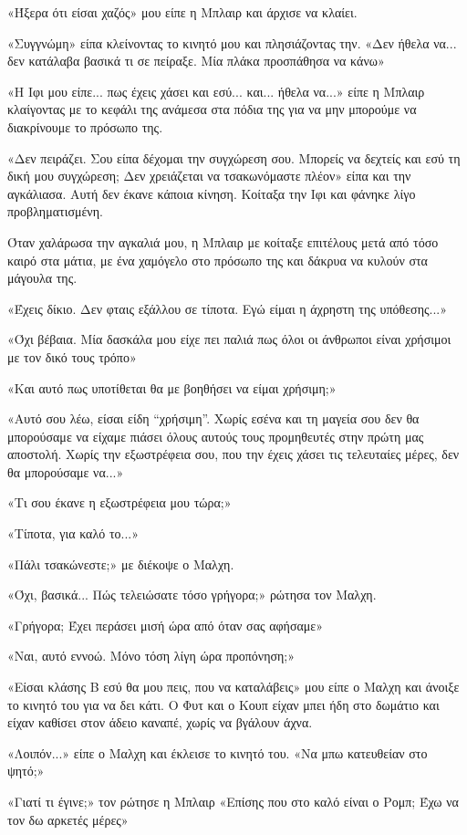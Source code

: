\documentclass[12pt,twoside, openany]{book}
\begin{document}
«Ήξερα ότι είσαι χαζός» μου είπε η Μπλαιρ και άρχισε να κλαίει.

«Συγγνώμη» είπα κλείνοντας το κινητό μου και πλησιάζοντας την. «Δεν ήθελα να... δεν κατάλαβα βασικά τι σε πείραξε. Μία πλάκα προσπάθησα να κάνω»

«Η Ιφι μου είπε... πως έχεις χάσει και εσύ... και... ήθελα να...» είπε η Μπλαιρ κλαίγοντας με το κεφάλι της ανάμεσα στα πόδια της για να μην μπορούμε να διακρίνουμε το πρόσωπο της.

«Δεν πειράζει. Σου είπα δέχομαι την συγχώρεση σου. Μπορείς να δεχτείς και εσύ τη δική μου συγχώρεση; Δεν χρειάζεται να τσακωνόμαστε πλέον» είπα και την αγκάλιασα. Αυτή δεν έκανε κάποια κίνηση. Κοίταξα την Ιφι και φάνηκε λίγο προβληματισμένη.

Όταν χαλάρωσα την αγκαλιά μου, η Μπλαιρ με κοίταξε επιτέλους μετά από τόσο καιρό στα μάτια, με ένα χαμόγελο στο πρόσωπο της και δάκρυα να κυλούν στα μάγουλα της.

«Έχεις δίκιο. Δεν φταις εξάλλου σε τίποτα. Εγώ είμαι η άχρηστη της υπόθεσης...»

«Όχι βέβαια. Μία δασκάλα μου είχε πει παλιά πως όλοι οι άνθρωποι είναι χρήσιμοι με τον δικό τους τρόπο»

«Και αυτό πως υποτίθεται θα με βοηθήσει να είμαι χρήσιμη;»

«Αυτό σου λέω, είσαι είδη “χρήσιμη”. Χωρίς εσένα και τη μαγεία σου δεν θα μπορούσαμε να είχαμε πιάσει όλους αυτούς τους προμηθευτές στην πρώτη μας αποστολή. Χωρίς την εξωστρέφεια σου, που την έχεις χάσει τις τελευταίες μέρες, δεν θα μπορούσαμε να...»

«Τι σου έκανε η εξωστρέφεια μου τώρα;»

«Τίποτα, για καλό το...»

«Πάλι τσακώνεστε;» με διέκοψε ο Μαλχη.

«Όχι, βασικά... Πώς τελειώσατε τόσο γρήγορα;» ρώτησα τον Μαλχη.

«Γρήγορα; Έχει περάσει μισή ώρα από όταν σας αφήσαμε»

«Ναι, αυτό εννοώ. Μόνο τόση λίγη ώρα προπόνηση;»

«Είσαι κλάσης Β εσύ θα μου πεις, που να καταλάβεις» μου είπε ο Μαλχη και άνοιξε το κινητό του για να δει κάτι. Ο Φυτ και ο Κουπ είχαν μπει ήδη στο δωμάτιο και είχαν καθίσει στον άδειο καναπέ, χωρίς να βγάλουν άχνα.

«Λοιπόν...» είπε ο Μαλχη και έκλεισε το κινητό του. «Να μπω κατευθείαν στο ψητό;»

«Γιατί τι έγινε;» τον ρώτησε η Μπλαιρ «Επίσης που στο καλό είναι ο Ρομπ; Έχω να τον δω αρκετές μέρες»
\end{document}
